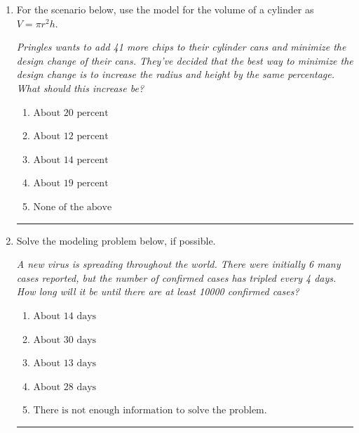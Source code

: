 \documentclass[14pt]{extbook}
\newcommand{\litem}[1]{\item#1\hspace*{-1cm}\rule{\textwidth}{0.4pt}}
\begin{document}
\begin{enumerate}
{\begin{enumerate}[label=\Alph*.]
\end{enumerate} }
\litem{
For the scenario below, use the model for the volume of a cylinder as $V = \pi r^2 h$.
\begin{center}
    \textit{ Pringles wants to add 41 \text{percent} more chips to their cylinder cans and minimize the design change of their cans. They've decided that the best way to minimize the design change is to increase the radius and height by the same percentage. What should this increase be? }
\end{center}
\begin{enumerate}[label=\Alph*.]
\item \( \text{About } 20 \text{ percent} \)
\item \( \text{About } 12 \text{ percent} \)
\item \( \text{About } 14 \text{ percent} \)
\item \( \text{About } 19 \text{ percent} \)
\item \( \text{None of the above} \)

\end{enumerate} }
\litem{
Solve the modeling problem below, if possible.
\begin{center}
    \textit{ A new virus is spreading throughout the world. There were initially 6 many cases reported, but the number of confirmed cases has tripled every 4 days. How long will it be until there are at least 10000 confirmed cases? }
\end{center}
\begin{enumerate}[label=\Alph*.]
\item \( \text{About } 14 \text{ days} \)
\item \( \text{About } 30 \text{ days} \)
\item \( \text{About } 13 \text{ days} \)
\item \( \text{About } 28 \text{ days} \)
\item \( \text{There is not enough information to solve the problem.} \)


\end{enumerate}}
\end{enumerate}
\end{document}
